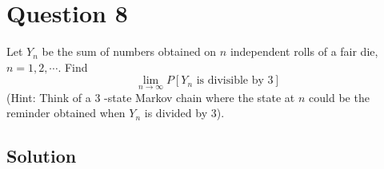 \section*{Question 8}

Let \( Y_{n} \) be the sum of numbers obtained on \( n \) independent rolls of a fair die, \( n=1,2, \cdots \).
Find
\[
    \lim _{n \rightarrow \infty} P\left[Y_{n} \text { is divisible by } 3\right]
\]
(Hint: Think of a 3 -state Markov chain where the state at \( n \) could be the reminder obtained when \( Y_{n} \) is divided by 3).

\subsection*{Solution}
